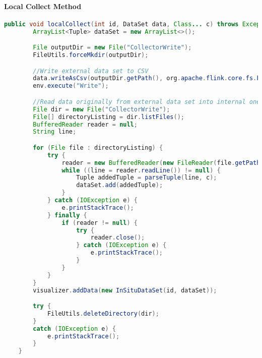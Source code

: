 \paragraph{Local Collect Method}
\begin{lstlisting}[language=Java,showspaces=false,showstringspaces=false,breaklines=true, breakatwhitespace=true]
    public void localCollect(int id, DataSet data, Class... c) throws Exception{
        ArrayList<Tuple> dataSet = new ArrayList<>();

        File outputDir = new File("CollectorWrite");
        FileUtils.forceMkdir(outputDir);

        //Write external data set to CSV
        data.writeAsCsv(outputDir.getPath(), org.apache.flink.core.fs.FileSystem.WriteMode.OVERWRITE);
        env.execute("Write");

        //Read data originally from external data set into internal one
        File dir = new File("CollectorWrite");
        File[] directoryListing = dir.listFiles();
        BufferedReader reader = null;
        String line;

        for (File file : directoryListing) {
            try {
                reader = new BufferedReader(new FileReader(file.getPath()));
                while ((line = reader.readLine()) != null) {
                    Tuple addedTuple = parseTuple(line, c);
                    dataSet.add(addedTuple);
                }
            } catch (IOException e) {
                e.printStackTrace();
            } finally {
                if (reader != null) {
                    try {
                        reader.close();
                    } catch (IOException e) {
                        e.printStackTrace();
                    }
                }
            }
        }
        visualizer.addData(new InSituDataSet(id, dataSet));

        try {
            FileUtils.deleteDirectory(dir);
        }
        catch (IOException e) {
            e.printStackTrace();
        }
    }
\end{lstlisting}
